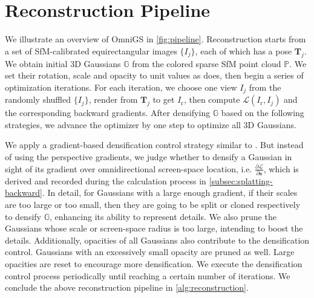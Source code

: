 \documentclass[10pt,twocolumn,letterpaper]{article}
\begin{document}
\section{Reconstruction Pipeline}

We illustrate an overview of OmniGS in \cref{fig:pipeline}. Reconstruction starts from a set of SfM-calibrated equirectangular images $\{I_j\}$, each of which has a pose $\mathbf{T}_j$. We obtain initial 3D Gaussians $\mathbb{G}$ from the colored sparse SfM point cloud $\mathbb{P}$. We set their rotation, scale and opacity to unit values as \cite{3dgs} does, then begin a series of optimization iterations. For each iteration, we choose one view $I_j$ from the randomly shuffled $\{I_j\}$, render from $\mathbf{T}_j$ to get $I_\text{r}$, then compute $\mathcal{L}(I_\text{r},I_j)$ and the corresponding backward gradients. After densifying $\mathbb{G}$ based on the following strategies, we advance the optimizer by one step to optimize all 3D Gaussians.

We apply a gradient-based densification control strategy similar to \cite{3dgs}. But instead of using the perspective gradients, we judge whether to densify a Gaussian in sight of its gradient over omnidirectional screen-space location, i.e. $\displaystyle{\frac{\partial \mathcal{L}}{\partial \mathbf{s}}}$, which is derived and recorded during the calculation process in \cref{subsec:splatting-backward}. In detail, for Gaussians with a large enough gradient, if their scales are too large or too small, then they are going to be split or cloned respectively to densify $\mathbb{G}$, enhancing its ability to represent details. We also prune the Gaussians whose scale or screen-space radius is too large, intending to boost the details. Additionally, opacities of all Gaussians also contribute to the densification control. Gaussians with an excessively small opacity are pruned as well. Large opacities are reset to encourage more densification. We execute the densification control process periodically until reaching a certain number of iterations. We conclude the above reconstruction pipeline in \cref{alg:reconstruction}.
\end{document}
